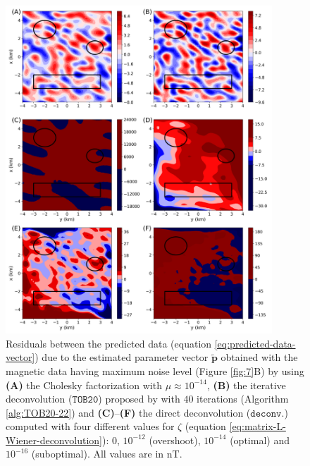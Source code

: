 \begin{figure}[htbp]
	\begin{center}
		\includegraphics[width=10cm]{Fig/stability_mag_comparison}
	\end{center}
	\caption{
		Residuals between the predicted data (equation \ref{eq:predicted-data-vector}) due to the estimated parameter vector
		$\tilde{\mathbf{p}}$ obtained with the magnetic data having maximum noise level (Figure \ref{fig:7}B) by using
		\textbf{(A)} the Cholesky factorization with $\mu \approx 10^{-14}$, 
		\textbf{(B)} the iterative deconvolution ($\mathtt{TOB20}$) proposed by \citet{takahashi-etal2022} with $40$ 
		iterations (Algorithm \ref{alg:TOB20-22}) and
		\textbf{(C)}--\textbf{(F)} the direct deconvolution ($\mathtt{deconv.}$) computed with four different 
		values for $\zeta$ (equation \ref{eq:matrix-L-Wiener-deconvolution}): $0$, $10^{-12}$ (overshoot), $10^{-14}$ (optimal)
		and $10^{-16}$ (suboptimal).
		All values are in $\mathrm{nT}$.
		}
	\label{fig:8}
\end{figure}


